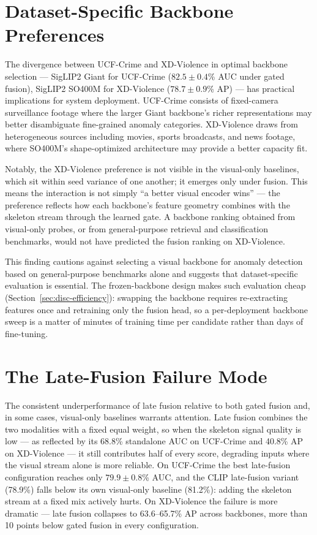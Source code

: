 \section{Dataset-Specific Backbone Preferences}
\label{sec:disc-backbones}

The divergence between UCF-Crime and XD-Violence in optimal backbone selection
--- SigLIP2 Giant for UCF-Crime ($82.5 \pm 0.4$\% AUC under gated fusion),
SigLIP2 SO400M for XD-Violence ($78.7 \pm 0.9$\% AP) --- has practical
implications for system deployment. UCF-Crime consists of fixed-camera
surveillance footage where the larger Giant backbone's richer representations
may better disambiguate fine-grained anomaly categories. XD-Violence draws
from heterogeneous sources including movies, sports broadcasts, and news
footage, where SO400M's shape-optimized architecture may provide a better
capacity fit.

Notably, the XD-Violence preference is not visible in the visual-only
baselines, which sit within seed variance of one another; it emerges only
under fusion. This means the interaction is not simply ``a better visual
encoder wins'' --- the preference reflects how each backbone's feature
geometry combines with the skeleton stream through the learned gate. A
backbone ranking obtained from visual-only probes, or from general-purpose
retrieval and classification benchmarks, would not have predicted the fusion
ranking on XD-Violence.

This finding cautions against selecting a visual backbone for anomaly
detection based on general-purpose benchmarks alone and suggests that
dataset-specific evaluation is essential. The frozen-backbone design makes
such evaluation cheap (Section~\ref{sec:disc-efficiency}): swapping the
backbone requires re-extracting features once and retraining only the fusion
head, so a per-deployment backbone sweep is a matter of minutes of training
time per candidate rather than days of fine-tuning.

\section{The Late-Fusion Failure Mode}
\label{sec:disc-latefusion}

The consistent underperformance of late fusion relative to both gated fusion
and, in some cases, visual-only baselines warrants attention. Late fusion
combines the two modalities with a fixed equal weight, so when the skeleton
signal quality is low --- as reflected by its 68.8\% standalone AUC on
UCF-Crime and 40.8\% AP on XD-Violence --- it still contributes half of every
score, degrading inputs where the visual stream alone is more reliable. On
UCF-Crime the best late-fusion configuration reaches only $79.9 \pm 0.8$\%
AUC, and the CLIP late-fusion variant (78.9\%) falls below its own visual-only
baseline (81.2\%): adding the skeleton stream at a fixed mix actively hurts.
On XD-Violence the failure is more dramatic --- late fusion collapses to
63.6--65.7\% AP across backbones, more than 10 points below gated fusion in
every configuration.

